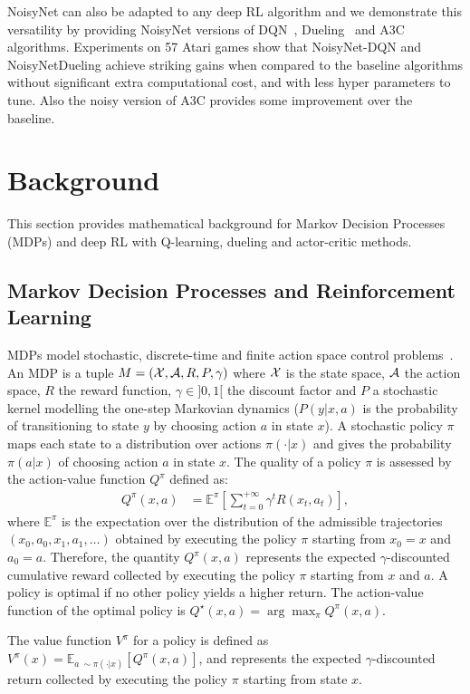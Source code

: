 \documentclass{article}
\newcommand{\algoinit}{NoisyNet}
\begin{document}
NoisyNet can also be adapted to any deep RL algorithm and we demonstrate this versatility by providing \algoinit{} versions of DQN~\citep{mnih2015human}, Dueling~\citep{wang2016Dueling} and A3C~\citep{mnih2016asynchronous} algorithms. Experiments on 57 Atari games show that NoisyNet-DQN and NoisyNetDueling achieve striking gains when compared to the baseline algorithms without significant extra computational cost, and with less hyper parameters to tune. Also the noisy version of A3C provides some improvement over the baseline.
\section{Background}
\label{sec:background}
This section provides mathematical background for Markov Decision Processes (MDPs) and deep RL with Q-learning, dueling and actor-critic methods.
\subsection{Markov Decision Processes and Reinforcement Learning}
MDPs model stochastic, discrete-time and finite action space control problems~\citep{bellman1965dynamic,bertsekas1995dynamic,puterman1994markov}.
An MDP is a tuple $M=(\mathcal X,\mathcal A,R,P,\gamma)$ where $\mathcal X$ is the state space, $\mathcal A$ the action space, $R$ the reward function, $\gamma\in ]0,1[$ the discount factor and $P$ a stochastic kernel modelling the one-step Markovian dynamics ($P(y|x,a)$ is the probability of transitioning to state $y$ by choosing action $a$ in state $x$). A stochastic policy $\pi$ maps each state to a distribution over actions $\pi(\cdot|x)$ and gives the probability $\pi(a|x)$ of choosing action $a$ in state $x$. The quality of a policy $\pi$ is assessed by the action-value function $Q^\pi$ defined as:
\begin{align}
Q^\pi(x,a)&=\mathbb{E}^\pi\left[\sum_{t=0}^{+\infty}\gamma^t R(x_t,a_t)\right],
\end{align}
where $\mathbb{E}^\pi$ is the expectation over the distribution of the admissible trajectories $(x_0,a_0,x_1, a_1,\dots)$ obtained by executing the policy $\pi$ starting from $x_0=x$ and $a_0=a$. Therefore, the quantity $Q^\pi(x,a)$ represents the expected $\gamma$-discounted cumulative reward collected by executing the policy $\pi$ starting from $x$ and $a$.
A policy is optimal if no other policy yields a higher return.
The action-value function of the optimal policy is $Q^\star(x, a) = \arg\max_\pi Q^\pi(x,a)$.

The value function $V^\pi$ for a policy is defined as $V^\pi(x)=\mathbb{E}_{a~\sim\pi(\cdot|x)}[Q^\pi(x,a)]$, and represents the expected $\gamma$-discounted return collected by executing the policy $\pi$ starting from state $x$.
\end{document}
